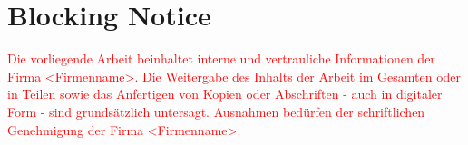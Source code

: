\section*{Blocking Notice}
\textcolor{red}{
Die vorliegende Arbeit beinhaltet interne und vertrauliche Informationen der Firma <Firmenname>.
Die Weitergabe des Inhalts der Arbeit im Gesamten oder in Teilen sowie das Anfertigen
von Kopien oder Abschriften - auch in digitaler Form - sind grundsätzlich untersagt.
Ausnahmen bedürfen der schriftlichen Genehmigung der Firma <Firmenname>.
}